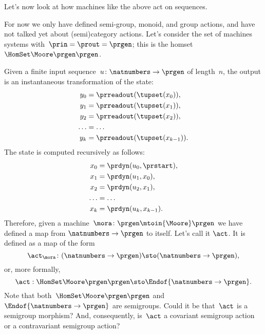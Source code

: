 Let's now look at how machines like the above act on sequences.

For now we only have defined semi-group, monoid, and group actions, and have not talked yet about (semi)category actions.
Let's consider the set of machines systems with~$\prin = \prout = \prgen$; this is the homset~$\HomSet\Moore\prgen\prgen$.

Given a finite input sequence~$u\colon \natnumbers \to \prgen$ of length~$n$, the output is an instantaneous transformation of the state:
%
\begin{equation}
    \label{eq:actions-on-sequences-y}
    \begin{aligned}
        y_0   & = \prreadout(\tupset(x_0)), \\
        y_1   & = \prreadout(\tupset(x_1)), \\
        y_2   & = \prreadout(\tupset(x_2)), \\
        \dots & = \dots \\
        y_{k} & = \prreadout(\tupset(x_{k-1})).
    \end{aligned}
\end{equation}
%
The state is computed recursively as follows:
\begin{equation}
    \label{eq:actions-on-sequences-x}
    \begin{aligned}
        x_0   & = \prdyn(u_0, \prstart), \\
        x_1   & = \prdyn(u_1, x_0), \\
        x_2   & = \prdyn(u_2, x_1), \\
        \dots & = \dots \\
        x_{k} & = \prdyn(u_{k}, x_{k-1}).
    \end{aligned}
\end{equation}
%
Therefore, given a machine~$\mora \colon \prgen \mtoin{\Moore} \prgen$ we have defined a map from $\natnumbers \to \prgen$ to itself.
Let's call it $\act$.
It is defined as a map of the form
%
\begin{equation}
    \label{eq:actions-on-sequences-1}
    \act_{\mora}\colon  (\natnumbers \to \prgen)  \sto  (\natnumbers \to \prgen),
\end{equation}
%
or, more formally,
%
\begin{equation}
    \label{eq:actions-on-sequences-2}
    \act: \HomSet\Moore\prgen\prgen \sto \Endof {\natnumbers \to \prgen}.
\end{equation}
%
Note that both~$\HomSet\Moore\prgen\prgen$ and $\Endof {\natnumbers \to \prgen}$ are semigroups.
Could it be that~$\act$ is a semigroup morphism?
And, consequently, is~$\act$ a covariant semigroup action or a contravariant semigroup action?

